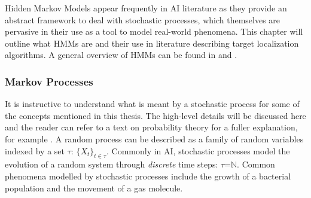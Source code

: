 Hidden Markov Models appear frequently in AI literature as they provide an abstract framework to deal with stochastic processes, which themselves are pervasive in their use as a tool to model real-world phenomena. This chapter will outline what HMMs are and their use in literature describing target localization algorithms. A general overview of HMMs can be found in \cite{Murphy1994DynamicLearning} and \cite{Ghahramani2001ANNETWORKS}.

\subsubsection{Markov Processes}
It is instructive to understand what is meant by a stochastic process for some of the concepts mentioned in this thesis. The high-level details will be discussed here and the reader can refer to a text on probability theory for a fuller explanation, for example \cite{papoulis02}. A random process can be described as a family of random variables indexed by a set $\tau$: $\{X_t\}_{t\in\tau}$. Commonly in AI, stochastic processes model the evolution of a random system through \textit{discrete} time steps: $\tau$=$\mathbb N$. Common phenomena modelled by stochastic processes include the growth of a bacterial population and the movement of a gas molecule.\par


